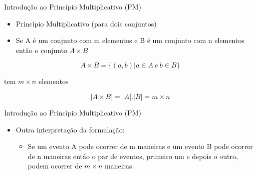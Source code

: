\documentclass[aspectratio=169]{beamer}
\begin{document}
\begin{frame}{Introdução ao Princípio Multiplicativo (PM)}
\begin{itemize}
    \item Princípio Multiplicativo (para dois conjuntos)
    \item[] Se A é um conjunto com m elementos e B é um conjunto com n elementos então o conjunto $A \times B$
\end{itemize}

\begin{center}
    $$A \times B = \{(a, b) | a \in A ~ e ~ b \in B\}$$
    
    tem $m \times n$ elementos
    
    $$|A \times B| = |A| . |B| =  m \times n$$
\end{center}
\end{frame}


\begin{frame}{Introdução ao Princípio Multiplicativo (PM)}
\begin{itemize}
    \item Outra interpretação da formulação:
    \begin{itemize}
        \item Se um evento A pode ocorrer de m maneiras e um evento B pode ocorrer de n maneiras então o par de eventos, primeiro um e depois o outro, podem ocorrer de $m \times n$ maneiras.
    \end{itemize}
    
\end{itemize}
\end{frame}
\end{document}
